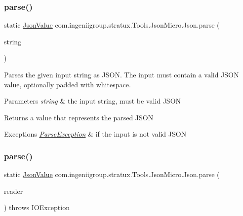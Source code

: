 \subsubsection{\texorpdfstring{parse()}{parse()}\hspace{0.1cm}{\footnotesize\ttfamily [1/2]}}
{\footnotesize\ttfamily static \hyperlink{classcom_1_1ingeniigroup_1_1stratux_1_1_tools_1_1_json_micro_1_1_json_value}{Json\+Value} com.\+ingeniigroup.\+stratux.\+Tools.\+Json\+Micro.\+Json.\+parse (\begin{DoxyParamCaption}\item[{String}]{string }\end{DoxyParamCaption})\hspace{0.3cm}{\ttfamily [static]}}

Parses the given input string as J\+S\+ON. The input must contain a valid J\+S\+ON value, optionally padded with whitespace.


\begin{DoxyParams}{Parameters}
{\em string} & the input string, must be valid J\+S\+ON \\
\hline
\end{DoxyParams}
\begin{DoxyReturn}{Returns}
a value that represents the parsed J\+S\+ON 
\end{DoxyReturn}

\begin{DoxyExceptions}{Exceptions}
{\em \hyperlink{classcom_1_1ingeniigroup_1_1stratux_1_1_tools_1_1_json_micro_1_1_parse_exception}{Parse\+Exception}} & if the input is not valid J\+S\+ON \\
\hline
\end{DoxyExceptions}
\mbox{\label{classcom_1_1ingeniigroup_1_1stratux_1_1_tools_1_1_json_micro_1_1_json_a74a0f7ea199004578d58033d765481bb}} 
\subsubsection{\texorpdfstring{parse()}{parse()}\hspace{0.1cm}{\footnotesize\ttfamily [2/2]}}
{\footnotesize\ttfamily static \hyperlink{classcom_1_1ingeniigroup_1_1stratux_1_1_tools_1_1_json_micro_1_1_json_value}{Json\+Value} com.\+ingeniigroup.\+stratux.\+Tools.\+Json\+Micro.\+Json.\+parse (\begin{DoxyParamCaption}\item[{Reader}]{reader }\end{DoxyParamCaption}) throws I\+O\+Exception\hspace{0.3cm}{\ttfamily [static]}}

